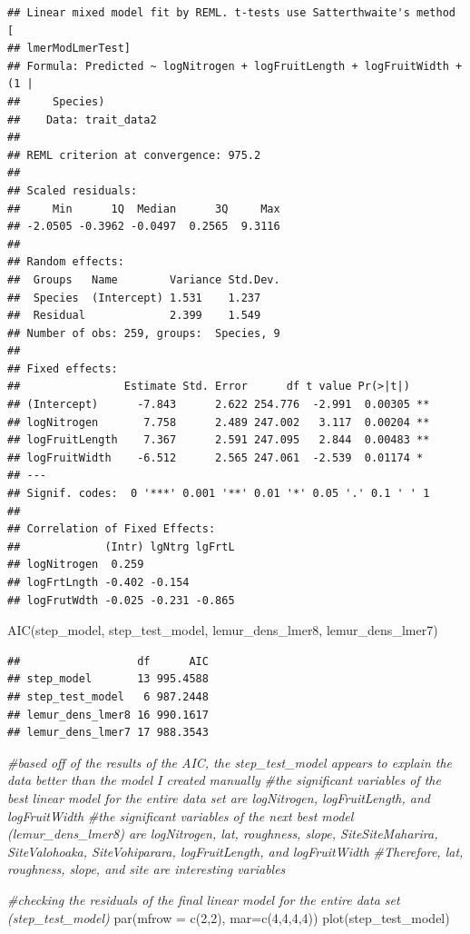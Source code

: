 \documentclass[
  12pt,
]{article}
\newenvironment{Shaded}{\begin{snugshade}}{\end{snugshade}}
\newcommand{\AttributeTok}[1]{\textcolor[rgb]{0.77,0.63,0.00}{#1}}
\newcommand{\CommentTok}[1]{\textcolor[rgb]{0.56,0.35,0.01}{\textit{#1}}}
\newcommand{\DecValTok}[1]{\textcolor[rgb]{0.00,0.00,0.81}{#1}}
\newcommand{\FunctionTok}[1]{\textcolor[rgb]{0.00,0.00,0.00}{#1}}
\newcommand{\NormalTok}[1]{#1}
\begin{document}
\begin{verbatim}
## Linear mixed model fit by REML. t-tests use Satterthwaite's method [
## lmerModLmerTest]
## Formula: Predicted ~ logNitrogen + logFruitLength + logFruitWidth + (1 |  
##     Species)
##    Data: trait_data2
## 
## REML criterion at convergence: 975.2
## 
## Scaled residuals: 
##     Min      1Q  Median      3Q     Max 
## -2.0505 -0.3962 -0.0497  0.2565  9.3116 
## 
## Random effects:
##  Groups   Name        Variance Std.Dev.
##  Species  (Intercept) 1.531    1.237   
##  Residual             2.399    1.549   
## Number of obs: 259, groups:  Species, 9
## 
## Fixed effects:
##                Estimate Std. Error      df t value Pr(>|t|)   
## (Intercept)      -7.843      2.622 254.776  -2.991  0.00305 **
## logNitrogen       7.758      2.489 247.002   3.117  0.00204 **
## logFruitLength    7.367      2.591 247.095   2.844  0.00483 **
## logFruitWidth    -6.512      2.565 247.061  -2.539  0.01174 * 
## ---
## Signif. codes:  0 '***' 0.001 '**' 0.01 '*' 0.05 '.' 0.1 ' ' 1
## 
## Correlation of Fixed Effects:
##             (Intr) lgNtrg lgFrtL
## logNitrogen  0.259              
## logFrtLngth -0.402 -0.154       
## logFrutWdth -0.025 -0.231 -0.865
\end{verbatim}

\begin{Shaded}
\begin{Highlighting}[]
\FunctionTok{AIC}\NormalTok{(step\_model, step\_test\_model, lemur\_dens\_lmer8, lemur\_dens\_lmer7)}
\end{Highlighting}
\end{Shaded}

\begin{verbatim}
##                  df      AIC
## step_model       13 995.4588
## step_test_model   6 987.2448
## lemur_dens_lmer8 16 990.1617
## lemur_dens_lmer7 17 988.3543
\end{verbatim}

\begin{Shaded}
\begin{Highlighting}[]
\CommentTok{\#based off of the results of the AIC, the step\_test\_model appears to explain the data better than the model I created manually}
\CommentTok{\#the significant variables of the best linear model for the entire data set are logNitrogen, logFruitLength, and logFruitWidth}
\CommentTok{\#the significant variables of the next best model (lemur\_dens\_lmer8) are logNitrogen, lat, roughness, slope, SiteSiteMaharira, SiteValohoaka, SiteVohiparara, logFruitLength, and logFruitWidth}
\CommentTok{\#Therefore, lat, roughness, slope, and site are interesting variables}

\CommentTok{\#checking the residuals of the final linear model for the entire data set (step\_test\_model)}
\FunctionTok{par}\NormalTok{(}\AttributeTok{mfrow =} \FunctionTok{c}\NormalTok{(}\DecValTok{2}\NormalTok{,}\DecValTok{2}\NormalTok{), }\AttributeTok{mar=}\FunctionTok{c}\NormalTok{(}\DecValTok{4}\NormalTok{,}\DecValTok{4}\NormalTok{,}\DecValTok{4}\NormalTok{,}\DecValTok{4}\NormalTok{))}
\FunctionTok{plot}\NormalTok{(step\_test\_model)}
\end{Highlighting}
\end{Shaded}
\end{document}
